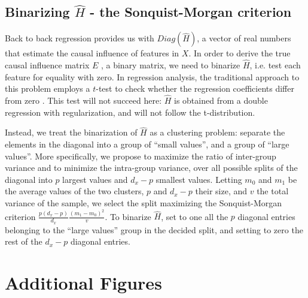 \subsection{Binarizing $\hat{H}$ - the Sonquist-Morgan criterion}

Back to back regression provides us with $Diag(\hat{H})$, a vector of real numbers that estimate the causal influence of features in $X$. In order to derive the true causal influence matrix $E$ , a binary matrix, we need to binarize  $\hat{H}$, i.e. test each feature for equality with zero. In regression analysis, the traditional approach to this problem employs a $t$-test to check whether the regression coefficients differ from zero \citep{student1908probable}. This test will not succeed here: $\hat{H}$ is obtained from a double regression with regularization, and will not follow the t-distribution.

Instead, we treat the binarization of $\hat{H}$ as a clustering problem: separate the elements in the diagonal into a group of ``small values'', and a group of ``large values''. More specifically, we propose to maximize the ratio of inter-group variance and to minimize the intra-group variance, over all possible splits of the diagonal into $p$ largest values and $d_x-p$ smallest values.
%
Letting $m_0$ and $m_1$ be the average values of the two clusters, $p$ and $d_x-p$ their size, and $v$ the total variance of the sample, we select the split maximizing the Sonquist-Morgan \citep{sonquist_morgan} \citep{kass75} criterion $\frac{p(d_x-p)}{d_x} \frac{(m_1 - m_0)^2}{v}$.
%
To binarize $\hat{H}$, set to one all the $p$ diagonal entries belonging to the ``large values'' group in the decided split, and setting to zero the rest of the $d_x-p$ diagonal entries.


\section{Additional Figures}


